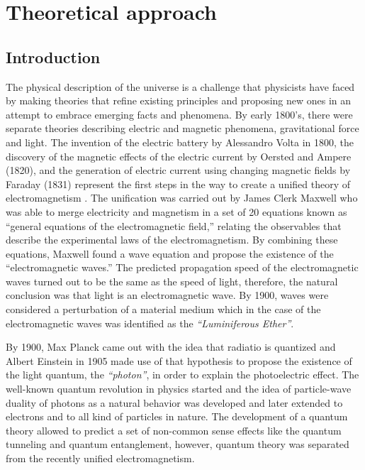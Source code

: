 \chapter{Theoretical approach}
\label{ch:Pyridine}

\section{Introduction}
\label{secc:Intro_th}

\noindent The physical description of the universe is a challenge that physicists have faced by making theories that refine existing principles and proposing new ones in an attempt to embrace emerging facts and phenomena. By early 1800's, there were separate theories describing electric and magnetic phenomena, gravitational force and light. The invention of the electric battery by Alessandro Volta in 1800, the discovery of the magnetic effects of the electric current by Oersted and Ampere (1820), and the generation of electric current using changing magnetic fields by Faraday (1831) represent the first steps in the way to create a unified theory of electromagnetism \cite{griffiths}. The unification was carried out by James Clerk Maxwell who was able to merge electricity and magnetism in a set of 20 equations known as ``general equations of the electromagnetic field,'' relating the observables that describe the experimental laws of the electromagnetism. By combining these equations, Maxwell found a wave equation and propose the existence of the ``electromagnetic waves.'' The predicted propagation speed of the electromagnetic waves turned out to be the same as the speed of light, therefore, the natural conclusion was that light is an electromagnetic wave\cite{maxwell}. By 1900, waves were considered a perturbation of a material medium which in the case of the electromagnetic waves was identified as the \textit{``Luminiferous Ether''}.

\noindent By 1900, Max Planck came out with the idea that radiatio is quantized\cite{planck} and Albert Einstein in 1905 made use of that hypothesis to propose the existence of the light quantum, the \textit{``photon''}, in order to explain the photoelectric effect\cite{photoeffect}. The well-known quantum revolution in physics started and the idea of particle-wave duality of photons as a natural behavior was developed and later extended to electrons and to all kind of particles in nature. The development of a quantum theory allowed to predict a set of non-common sense effects like the quantum tunneling and quantum entanglement, however, quantum theory was separated from the recently unified electromagnetism.


